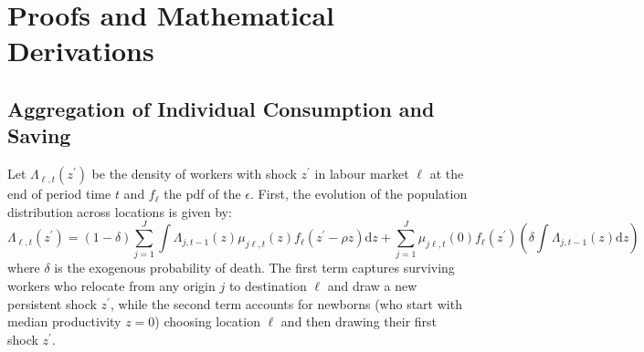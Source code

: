 \documentclass[11pt, a4paper]{article}
\begin{document}
\appendix
{}
\section{Proofs and Mathematical Derivations}
\label{app:proofs}
\subsection{Aggregation of Individual Consumption and Saving}
Let $\Lambda_{\ell, t}(z^\prime)$ be the density of workers with shock $z^\prime$ in labour market $\ell$ at the end of period time $t$ and $f_\ell$ the pdf of the $\epsilon$. First, the evolution of the population distribution across locations is given by:
\begin{equation}
\Lambda_{\ell,t}(z^\prime) = (1-\delta) \sum_{j=1}^J \int \Lambda_{j,t-1}(z) \mu_{j\ell,t}(z) f_\ell(z^\prime - \rho z) \mathrm{d}z + \sum_{j=1}^J \mu_{j\ell,t}(0) f_\ell(z^\prime) \left( \delta \int \Lambda_{j,t-1}(z) \mathrm{d}z \right)
\end{equation}
where $\delta$ is the exogenous probability of death. The first term captures surviving workers who relocate from any origin $j$ to destination $\ell$ and draw a new persistent shock $z^\prime$, while the second term accounts for newborns (who start with median productivity $z=0$) choosing location $\ell$ and then drawing their first shock $z^\prime$. 
\end{document}

